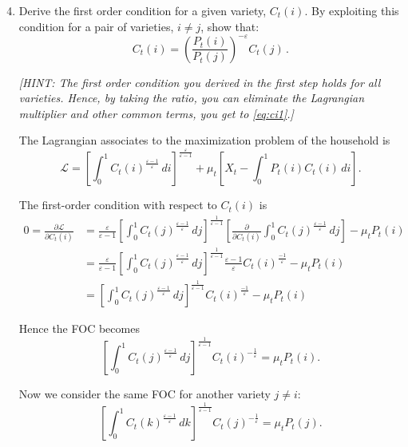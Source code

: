 \documentclass[dvipsnames,11pt]{article}
\begin{document}
        \begin{enumerate}
        \setcounter{enumi}{3}
            \item Derive the first order condition for a given variety, $C_t(i)$. By exploiting this condition for a pair of varieties, $i\neq j$, show that:
            \begin{equation}\label{eq:ci1}
            C_{t}(i)=\left( \frac{P_{t}(i)}{P_{t}(j)}\right) ^{-\varepsilon }C_{t}(j)\,.  
            \end{equation}
            
            \textit{[HINT: The first order condition you derived in the first step holds for all varieties. Hence, by taking the ratio, you can eliminate the Lagrangian multiplier and other common terms, you get to \ref{eq:ci1}.]}

\begin{solution}
The Lagrangian associates to the maximization problem of the household is
\[
\mathcal{L}
=
\left[\int_0^1 C_t(i)^{\frac{\varepsilon-1}{\varepsilon}}\,di\right]^{\frac{\varepsilon}{\varepsilon-1}}
+\mu_t\left[
X_t-\int_0^1 P_t(i)C_t(i)\,di
\right].
\]

The first-order condition with respect to \(C_t(i)\) is
\begin{align*}
0 = \frac{\partial \mathcal{L}}{\partial C_t(i)}& = \frac{\varepsilon}{\varepsilon - 1} \left[\int_0^1 C_t(j)^{\frac{\varepsilon-1}{\varepsilon}}\,dj\right]^{\frac{1}{\varepsilon - 1}} \left[\frac{\partial }{\partial C_t(i)}\int_0^1 C_t(j)^{\frac{\varepsilon-1}{\varepsilon}}\,dj\right] - \mu_t P_t(i) \\
& =  \frac{\varepsilon}{\varepsilon - 1} \left[\int_0^1 C_t(j)^{\frac{\varepsilon-1}{\varepsilon}}\,dj\right]^{\frac{1}{\varepsilon - 1}} \frac{\varepsilon - 1}{\varepsilon}C_t(i)^{\frac{-1}{\varepsilon}} - \mu_t P_t(i) \\
& =  \left[\int_0^1 C_t(j)^{\frac{\varepsilon-1}{\varepsilon}}\,dj\right]^{\frac{1}{\varepsilon - 1}} C_t(i)^{\frac{-1}{\varepsilon}} - \mu_t P_t(i)
\end{align*}

Hence the FOC becomes
\[
\left[
\int_0^1 C_t(j)^{\frac{\varepsilon-1}{\varepsilon}}\,dj
\right]^{\frac{1}{\varepsilon-1}}
C_t(i)^{-\frac{1}{\varepsilon}}
=
\mu_t P_t(i).
\]

Now we consider the same FOC for another variety \(j\neq i\):
\[
\left[
\int_0^1 C_t(k)^{\frac{\varepsilon-1}{\varepsilon}}\,dk
\right]^{\frac{1}{\varepsilon-1}}
C_t(j)^{-\frac{1}{\varepsilon}}
=
\mu_t P_t(j).
\]


\end{solution}
\end{enumerate}
\end{document}
